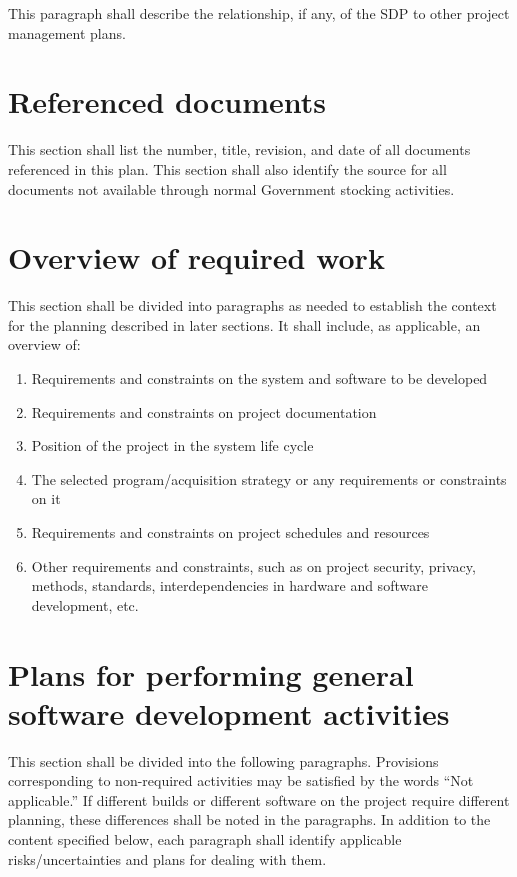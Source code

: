 \documentclass{fidata-report-template}
\begin{document}
This paragraph shall describe the relationship, if any, of the SDP to
other project management plans.

\section{Referenced documents}

This section shall list the number, title, revision, and date of all
documents referenced in this plan. This section shall also identify the
source for all documents not available through normal Government
stocking activities.

\section{Overview of required work}

This section shall be divided into paragraphs as needed to establish the
context for the planning described in later sections. It shall include,
as applicable, an overview of:

\begin{enumerate}
\itemsep1pt\parskip0pt
\item
  Requirements and constraints on the system and software to be
  developed
\item
  Requirements and constraints on project documentation
\item
  Position of the project in the system life cycle
\item
  The selected program/acquisition strategy or any requirements or
  constraints on it
\item
  Requirements and constraints on project schedules and resources
\item
  Other requirements and constraints, such as on project security,
  privacy, methods, standards, interdependencies in hardware and
  software development, etc.
\end{enumerate}

\section{Plans for performing general software development
activities}

This section shall be divided into the following paragraphs. Provisions
corresponding to non-required activities may be satisfied by the words
``Not applicable.'' If different builds or different software on the
project require different planning, these differences shall be noted in
the paragraphs. In addition to the content specified below, each
paragraph shall identify applicable risks/uncertainties and plans for
dealing with them.
\end{document}
